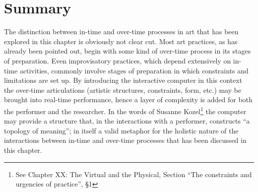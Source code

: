 \section*{Summary}
\label{sec:summary}

The distinction between in-time and over-time processes in art that has been explored in this chapter is obviously not clear cut. Most art practices, as has already been pointed out, begin with some kind of over-time process in its stages of preparation. Even improvisatory practices, which depend extensively on in-time activities, commonly involve stages of preparation in which constraints and  limitations are set up. By introducing the interactive computer in this context the over-time articulations (artistic structures, constraints, form, etc.) may be brought into real-time performance, hence a layer of complexity is added for both the performer and the researcher. In the words of Susanne Kozel\footnote{See Chapter XX: The Virtual and the Physical, Section ``The constraints and urgencies of practice'', \S1} the computer may provide a structure that, in the interactions with a performer, constructs ``a topology of meaning''; in itself a valid metaphor for the holistic nature of the interactions between in-time and over-time processes that has been discussed in this chapter.


